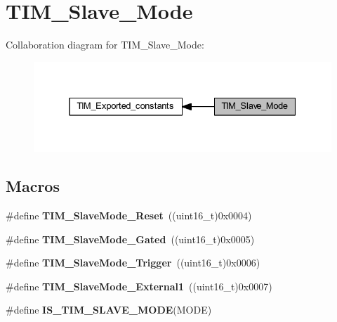 \hypertarget{group___t_i_m___slave___mode}{}\section{T\+I\+M\+\_\+\+Slave\+\_\+\+Mode}
\label{group___t_i_m___slave___mode}
Collaboration diagram for T\+I\+M\+\_\+\+Slave\+\_\+\+Mode\+:
\nopagebreak
\begin{figure}[H]
\begin{center}
\leavevmode
\includegraphics[width=331pt]{group___t_i_m___slave___mode}
\end{center}
\end{figure}
\subsection*{Macros}
\begin{DoxyCompactItemize}
\item 
\mbox{\label{group___t_i_m___slave___mode_gaac1cec731f1a5e680a038c4f472f74af}} 
\#define {\bfseries T\+I\+M\+\_\+\+Slave\+Mode\+\_\+\+Reset}~((uint16\+\_\+t)0x0004)
\item 
\mbox{\label{group___t_i_m___slave___mode_ga1f36c870b926f70b32f274bbc0bc39a5}} 
\#define {\bfseries T\+I\+M\+\_\+\+Slave\+Mode\+\_\+\+Gated}~((uint16\+\_\+t)0x0005)
\item 
\mbox{\label{group___t_i_m___slave___mode_ga9e7726c04ee1bafec97226f08adf5677}} 
\#define {\bfseries T\+I\+M\+\_\+\+Slave\+Mode\+\_\+\+Trigger}~((uint16\+\_\+t)0x0006)
\item 
\mbox{\label{group___t_i_m___slave___mode_ga34427a693157ab177fead9871185bd35}} 
\#define {\bfseries T\+I\+M\+\_\+\+Slave\+Mode\+\_\+\+External1}~((uint16\+\_\+t)0x0007)
\item 
\#define {\bfseries I\+S\+\_\+\+T\+I\+M\+\_\+\+S\+L\+A\+V\+E\+\_\+\+M\+O\+DE}(M\+O\+DE)
\end{DoxyCompactItemize}


